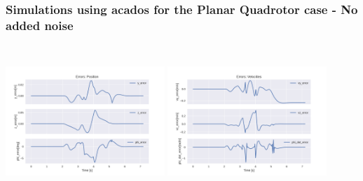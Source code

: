 \documentclass{thesisbeamer}
\newcommand\Fontvi{\fontsize{9}{10}\selectfont}
\begin{document}
\begin{frame}
	\frametitle{Simulations using acados for the Planar Quadrotor case - No added noise}
	\Fontvi
	
	\begin{columns}[t]
		\centering
			\includegraphics[width=6cm,height=5cm]{Images/acados_simulations/flip_trajectory/planar_quadrotor/noiseless/Errors_position.png}
			\centering
			\includegraphics[width=6cm,height=5cm]{Images/acados_simulations/flip_trajectory/planar_quadrotor/noiseless/Errors_velocities.png}
	\end{columns}
	
	
\end{frame}
\end{document}

